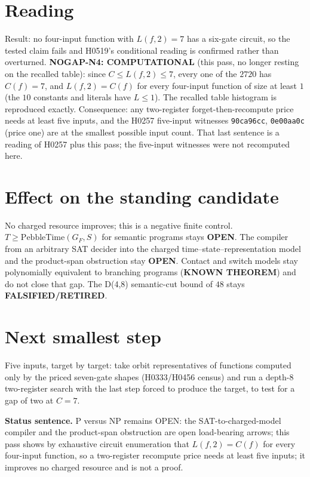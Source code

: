 \documentclass[11pt]{article}
\begin{document}
\section*{Reading}
Result: no four-input function with $L(f,2)=7$ has a six-gate circuit, so the tested claim fails and H0519's conditional reading is confirmed rather than overturned.
\textbf{NOGAP-N4: COMPUTATIONAL} (this pass, no longer resting on the recalled table): since $C\le L(f,2)\le7$, every one of the $2720$ has $C(f)=7$, and $L(f,2)=C(f)$ for every four-input function of size at least $1$ (the $10$ constants and literals have $L\le1$). The recalled table histogram is reproduced exactly.
Consequence: any two-register forget-then-recompute price needs at least five inputs, and the H0257 five-input witnesses \texttt{90ca96cc}, \texttt{0e00aa0c} (price one) are at the smallest possible input count. That last sentence is a reading of H0257 plus this pass; the five-input witnesses were not recomputed here.

\section*{Effect on the standing candidate}
No charged resource improves; this is a negative finite control. $T\ge\mathrm{PebbleTime}(G_F,S)$ for semantic programs stays \textbf{OPEN}. The compiler from an arbitrary SAT decider into the charged time--state--representation model and the product-span obstruction stay \textbf{OPEN}. Contact and switch models stay polynomially equivalent to branching programs (\textbf{KNOWN THEOREM}) and do not close that gap. The D(4,8) semantic-cut bound of $48$ stays \textbf{FALSIFIED/RETIRED}.

\section*{Next smallest step}
Five inputs, target by target: take orbit representatives of functions computed only by the priced seven-gate shapes (H0333/H0456 census) and run a depth-$8$ two-register search with the last step forced to produce the target, to test for a gap of two at $C=7$.

\bigskip
\noindent\textbf{Status sentence.} P versus NP remains OPEN: the SAT-to-charged-model compiler and the product-span obstruction are open load-bearing arrows; this pass shows by exhaustive circuit enumeration that $L(f,2)=C(f)$ for every four-input function, so a two-register recompute price needs at least five inputs; it improves no charged resource and is not a proof.
\end{document}
